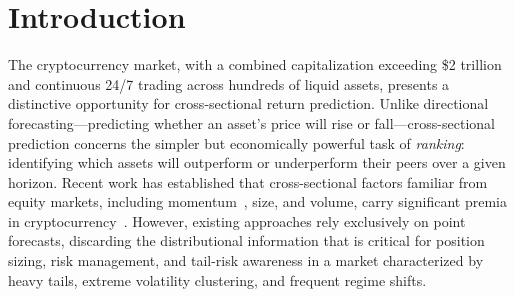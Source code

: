 \documentclass[sigconf]{acmart}
\begin{document}
\maketitle

%

\section{Introduction}

The cryptocurrency market, with a combined capitalization exceeding \$2 trillion and continuous 24/7 trading across hundreds of liquid assets, presents a distinctive opportunity for cross-sectional return prediction.
Unlike directional forecasting---predicting whether an asset's price will rise or fall---cross-sectional prediction concerns the simpler but economically powerful task of \emph{ranking}: identifying which assets will outperform or underperform their peers over a given horizon.
Recent work has established that cross-sectional factors familiar from equity markets, including momentum~\cite{liu2022}, size, and volume, carry significant premia in cryptocurrency~\cite{fieberg2024}.
However, existing approaches rely exclusively on point forecasts, discarding the distributional information that is critical for position sizing, risk management, and tail-risk awareness in a market characterized by heavy tails, extreme volatility clustering, and frequent regime shifts.
\end{document}
